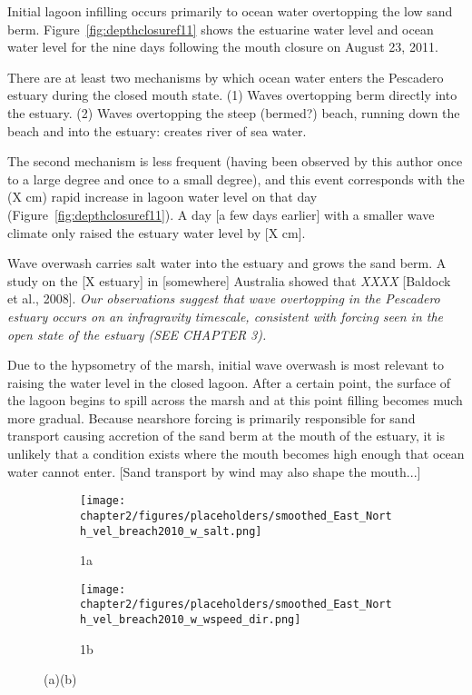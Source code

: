 Initial lagoon infilling occurs primarily to ocean water overtopping the
low sand berm. Figure~\ref{fig:depthclosuref11} shows the estuarine water level and ocean
water level for the nine days following the mouth closure on August 23, 2011. 

There are at least two mechanisms by which ocean water enters the
Pescadero estuary during the closed mouth state. (1) Waves overtopping
berm directly into the estuary. (2) Waves overtopping the steep
(bermed?) beach, running down the beach and into the estuary: creates
river of sea water.

The second mechanism is less frequent (having been observed by this author once to a large degree and once to a small degree), and this event corresponds with 
the (X cm) rapid increase in lagoon water level on that day (Figure~\ref{fig:depthclosuref11}). A day
[a few days earlier] with a smaller wave climate only raised the estuary
water level by [X cm].

Wave overwash carries salt water into the estuary and
grows the sand berm. A study on the [X estuary] in [somewhere] Australia
showed that \emph{XXXX} [Baldock et al., 2008]. \emph{Our observations suggest that wave overtopping in the Pescadero 
estuary occurs on an infragravity timescale, consistent with forcing seen in the open state of the estuary (SEE CHAPTER 3).}

Due to the hypsometry of the marsh, initial wave overwash is most
relevant to raising the water level in the closed lagoon. After a
certain point, the surface of the lagoon begins to spill across the
marsh and at this point filling becomes much more gradual. Because
nearshore forcing is primarily responsible for sand transport causing accretion of the sand berm at the mouth of the estuary, it is unlikely that a
condition exists where the mouth becomes high enough that ocean water
cannot enter. [Sand transport by wind may also shape the mouth...]



\begin{figure}[t]
\begin{subfigure}{.5\textwidth}
	\centering
	\texttt{[image: chapter2/figures/placeholders/smoothed\_East\_North\_vel\_breach2010\_w\_salt.png]}
	\caption{1a}
	\label{fig:closed_UVwindsalta}
\end{subfigure}
\begin{subfigure}{.5\textwidth}
	\centering
	\texttt{[image: chapter2/figures/placeholders/smoothed\_East\_North\_vel\_breach2010\_w\_wspeed\_dir.png]}
	\caption{1b}
	\label{fig:closed_UVwindsaltb}
\end{subfigure}
\caption{(a)(b)}
\label{fig:close_UVwindsalt}
\end{figure}

